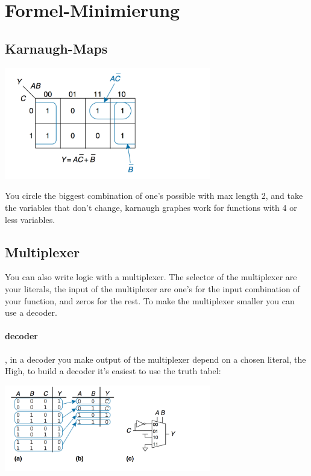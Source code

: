 \newpage
\section{Formel-Minimierung}
	
	\begin{multicols}{2}
	
		\subsection{Karnaugh-Maps}
			\begin{center}
				\includegraphics[width = 9cm]{images/minim/karnaugh}
			\end{center}
			You circle the biggest combination of one's possible with max length 2, and take the variables that don't change, karnaugh graphes work for functions with 4 or less variables.
		\subsection{Multiplexer}
			You can also write logic with a multiplexer. The selector of the multiplexer are your literals, the input of the multiplexer are one's for the input combination of your function, and zeros for the rest. To make the multiplexer smaller you can use a decoder.
			\paragraph{decoder}, in a decoder you make output of the multiplexer depend on a chosen literal, the High, to build a decoder it's easiest to use the truth tabel:
			\begin{center}
				\includegraphics[width = 9cm]{images/minim/decoder}
			\end{center}			
	\end{multicols}























